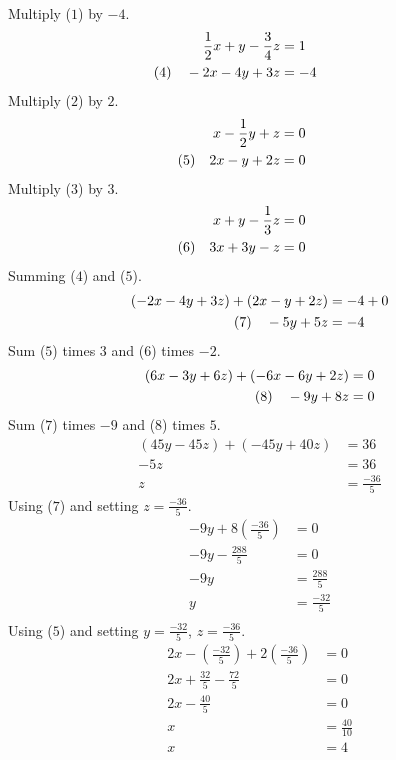 \documentclass[6pt]{article}
\begin{document}
Multiply ($1$) by $-4$.
\begin{align*}
    \frac{1}{2}x + y - \frac{3}{4}z &= 1 \\
    \hspace{-2cm}\text{(4)}\quad -2x - 4y + 3z &= -4 
\end{align*}
Multiply ($2$) by $2$.
\begin{align*}
    x - \frac{1}{2}y + z &= 0 \\
    \hspace{-2cm}\text{(5)}\quad 2x - y + 2z &= 0
\end{align*}
Multiply ($3$) by $3$.
\begin{align*}
    x + y - \frac{1}{3}z &= 0 \\
    \hspace{-2cm}\text{(6)}\quad 3x + 3y - z &= 0
\end{align*}
Summing ($4$) and ($5$).
\begin{align*}
    (-2x - 4y + 3z) + (2x - y + 2z) &= -4 + 0 \\
    \hspace{-2cm}\text{(7)}\quad -5y + 5z &= -4 
\end{align*}
Sum ($5$) times $3$ and ($6$) times $-2$.
\begin{align*}
    (6x - 3y + 6z) + (-6x - 6y + 2z) &= 0 \\
    \hspace{-2cm}\text{(8)}\quad -9y + 8z &= 0
\end{align*}
Sum ($7$) times $-9$ and ($8$) times $5$.
\begin{align*}
    (45y - 45z) + (-45y + 40z) &= 36 \\
    -5z &= 36 \\
    z &= \frac{-36}{5}
\end{align*}
Using ($7$) and setting $z = \frac{-36}{5}$.
\begin{align*}
    -9y + 8(\frac{-36}{5}) &= 0 \\
    -9y - \frac{288}{5} &= 0 \\
    -9y &= \frac{288}{5} \\
    y &= \frac{-32}{5} \\
\end{align*}
Using ($5$) and setting $y = \frac{-32}{5}$, $z = \frac{-36}{5}$.
\begin{align*}
    2x - (\frac{-32}{5}) + 2(\frac{-36}{5}) &= 0 \\
    2x + \frac{32}{5} - \frac{72}{5} &= 0 \\
    2x - \frac{40}{5}  &= 0 \\
    x &= \frac{40}{10}  \\
    x &= 4 
\end{align*}
\end{document}
